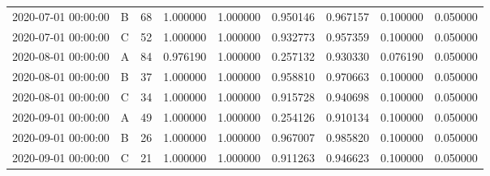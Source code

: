 \begin{tabular}{llrrrrrrr}
2020-07-01 00:00:00 & B & 68 & 1.000000 & 1.000000 & 0.950146 & 0.967157 & 0.100000 & 0.050000 \\
2020-07-01 00:00:00 & C & 52 & 1.000000 & 1.000000 & 0.932773 & 0.957359 & 0.100000 & 0.050000 \\
2020-08-01 00:00:00 & A & 84 & 0.976190 & 1.000000 & 0.257132 & 0.930330 & 0.076190 & 0.050000 \\
2020-08-01 00:00:00 & B & 37 & 1.000000 & 1.000000 & 0.958810 & 0.970663 & 0.100000 & 0.050000 \\
2020-08-01 00:00:00 & C & 34 & 1.000000 & 1.000000 & 0.915728 & 0.940698 & 0.100000 & 0.050000 \\
2020-09-01 00:00:00 & A & 49 & 1.000000 & 1.000000 & 0.254126 & 0.910134 & 0.100000 & 0.050000 \\
2020-09-01 00:00:00 & B & 26 & 1.000000 & 1.000000 & 0.967007 & 0.985820 & 0.100000 & 0.050000 \\
2020-09-01 00:00:00 & C & 21 & 1.000000 & 1.000000 & 0.911263 & 0.946623 & 0.100000 & 0.050000 \\
\bottomrule
\end{tabular}
